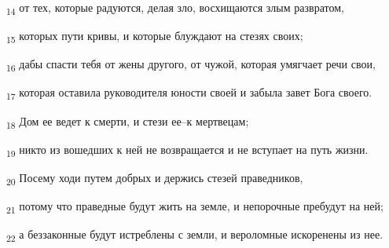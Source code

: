 \begin{tcolorbox}
\textsubscript{14} от тех, которые радуются, делая зло, восхищаются злым развратом,
\end{tcolorbox}
\begin{tcolorbox}
\textsubscript{15} которых пути кривы, и которые блуждают на стезях своих;
\end{tcolorbox}
\begin{tcolorbox}
\textsubscript{16} дабы спасти тебя от жены другого, от чужой, которая умягчает речи свои,
\end{tcolorbox}
\begin{tcolorbox}
\textsubscript{17} которая оставила руководителя юности своей и забыла завет Бога своего.
\end{tcolorbox}
\begin{tcolorbox}
\textsubscript{18} Дом ее ведет к смерти, и стези ее--к мертвецам;
\end{tcolorbox}
\begin{tcolorbox}
\textsubscript{19} никто из вошедших к ней не возвращается и не вступает на путь жизни.
\end{tcolorbox}
\begin{tcolorbox}
\textsubscript{20} Посему ходи путем добрых и держись стезей праведников,
\end{tcolorbox}
\begin{tcolorbox}
\textsubscript{21} потому что праведные будут жить на земле, и непорочные пребудут на ней;
\end{tcolorbox}
\begin{tcolorbox}
\textsubscript{22} а беззаконные будут истреблены с земли, и вероломные искоренены из нее.
\end{tcolorbox}
